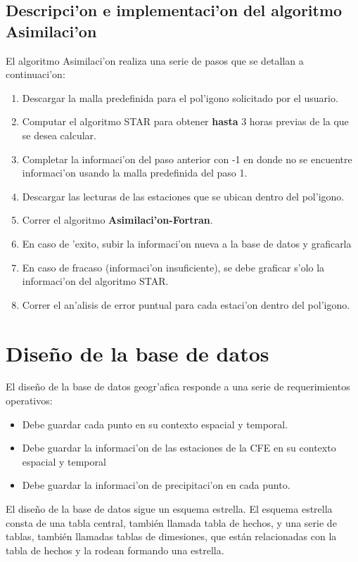 \subsection{Descripci'on e implementaci'on del algoritmo Asimilaci'on}
El algoritmo Asimilaci'on realiza una serie de pasos que se detallan a continuaci'on:
\begin{enumerate}
 \item Descargar la malla predefinida para el pol'igono solicitado por el usuario.
  \item Computar el algoritmo STAR para obtener \textbf{hasta} 3 horas previas de la que se desea calcular.
  \item Completar la informaci'on del paso anterior con -1 en donde no se encuentre informaci'on usando la malla predefinida del paso 1.
  \item Descargar las lecturas de las estaciones que se ubican dentro del pol'igono.
  \item Correr el algoritmo \textbf{Asimilaci'on-Fortran}.
  \item En caso de 'exito, subir la informaci'on nueva a la base de datos y graficarla
  \item En caso de fracaso (informaci'on insuficiente), se debe graficar s'olo la informaci'on del algoritmo STAR.
  \item Correr el an'alisis de error puntual para cada estaci'on dentro del pol'igono.
\end{enumerate}


\section{Dise\~no de la base de datos}

El dise\~no de la base de datos geogr'afica responde a una serie de requerimientos operativos:
\begin{itemize}
 \item Debe guardar cada punto en su contexto espacial y temporal.
 \item Debe guardar la informaci'on de las estaciones de la CFE en su contexto espacial y temporal
 \item Debe guardar la informaci'on de precipitaci'on en cada punto.
\end{itemize}
El dise\~no de la base de datos sigue un esquema estrella\cite{starsqueme}. El esquema estrella consta de una tabla central, tambi\'en 
llamada tabla de hechos, y una serie de tablas, tambi\'en llamadas tablas de dimesiones, que est\'an relacionadas con la tabla de hechos y la rodean 
formando una estrella. 

